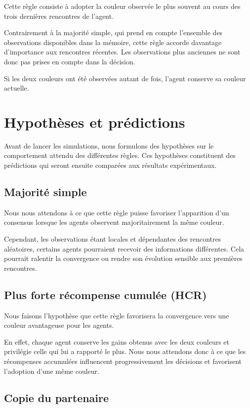 \documentclass[12pt,a4paper]{article}
\begin{document}
Cette règle consiste à adopter la couleur observée le plus souvent
au cours des trois dernières rencontres de l'agent.

Contrairement à la majorité simple, qui prend en compte l'ensemble
des observations disponibles dans la mémoire, cette règle accorde
davantage d'importance aux rencontres récentes. Les observations
plus anciennes ne sont donc pas prises en compte dans la décision.

Si les deux couleurs ont été observées autant de fois, l'agent
conserve sa couleur actuelle.

\section{Hypothèses et prédictions}

Avant de lancer les simulations, nous formulons des hypothèses
sur le comportement attendu des différentes règles.
Ces hypothèses constituent des prédictions qui seront ensuite
comparées aux résultats expérimentaux.

\subsection{Majorité simple}

Nous nous attendons à ce que cette règle puisse favoriser
l'apparition d'un consensus lorsque les agents observent
majoritairement la même couleur.

Cependant, les observations étant locales et dépendantes des
rencontres aléatoires, certains agents pourraient recevoir des
informations différentes. Cela pourrait ralentir la convergence
ou rendre son évolution sensible aux premières rencontres.

\subsection{Plus forte récompense cumulée (HCR)}

Nous faisons l'hypothèse que cette règle favorisera la convergence
vers une couleur avantageuse pour les agents.

En effet, chaque agent conserve les gains obtenus avec les deux
couleurs et privilégie celle qui lui a rapporté le plus.
Nous nous attendons donc à ce que les récompenses accumulées
influencent progressivement les décisions et favorisent
l'adoption d'une même couleur.

\subsection{Copie du partenaire}
\end{document}
